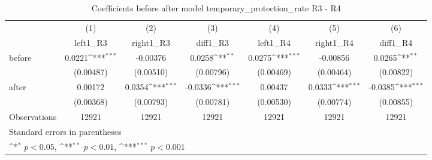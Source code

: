\begin{table}[htbp]\centering
\def\sym#1{\ifmmode^{#1}\else\(^{#1}\)\fi}
\caption{Coefficients before after model temporary\_protection\_rate R3 - R4}
\begin{tabular}{l*{6}{c}}
\hline\hline
                    &\multicolumn{1}{c}{(1)}&\multicolumn{1}{c}{(2)}&\multicolumn{1}{c}{(3)}&\multicolumn{1}{c}{(4)}&\multicolumn{1}{c}{(5)}&\multicolumn{1}{c}{(6)}\\
                    &\multicolumn{1}{c}{left1\_R3}&\multicolumn{1}{c}{right1\_R3}&\multicolumn{1}{c}{diff1\_R3}&\multicolumn{1}{c}{left1\_R4}&\multicolumn{1}{c}{right1\_R4}&\multicolumn{1}{c}{diff1\_R4}\\
\hline
before              &      0.0221\sym{***}&    -0.00376         &      0.0258\sym{**} &      0.0275\sym{***}&    -0.00856         &      0.0265\sym{**} \\
                    &   (0.00487)         &   (0.00510)         &   (0.00796)         &   (0.00469)         &   (0.00464)         &   (0.00822)         \\
[1em]
after               &     0.00172         &      0.0354\sym{***}&     -0.0336\sym{***}&     0.00437         &      0.0333\sym{***}&     -0.0385\sym{***}\\
                    &   (0.00368)         &   (0.00793)         &   (0.00781)         &   (0.00530)         &   (0.00774)         &   (0.00855)         \\
\hline
Observations        &       12921         &       12921         &       12921         &       12921         &       12921         &       12921         \\
\hline\hline
\multicolumn{7}{l}{\footnotesize Standard errors in parentheses}\\
\multicolumn{7}{l}{\footnotesize \sym{*} \(p<0.05\), \sym{**} \(p<0.01\), \sym{***} \(p<0.001\)}\\
\end{tabular}
\end{table}
